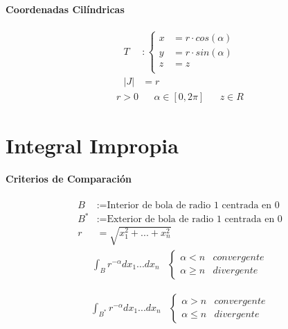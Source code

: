 \documentclass{article}
\begin{document}
\begin{multicols}{2}
      \paragraph{Coordenadas Cilíndricas}

        \begin{align*}
          T &:
          \begin{cases}
            x &= r \cdot cos(\alpha)\\
            y &= r \cdot sin(\alpha)\\
            z &= z \\
          \end{cases} \\
          \left|J\right| &= r
        \end{align*}
        \begin{align*}
          r > 0 &&  \alpha \in[0,2\pi] && z \in R
        \end{align*}

    \section{Integral Impropia}

      \paragraph{Criterios de Comparación}
        \begin{align*}
          B &:= \text{Interior de bola de radio 1 centrada en 0} \\
          B^* &:= \text{Exterior de bola de radio 1 centrada en 0} \\
          r &= \sqrt{x_1^2 + ... + x_n^2}
        \end{align*}
        \begin{align*}
          \int_B r^{-\alpha} dx_1...dx_n &
          \begin{cases}
            \alpha < n & convergente\\
            \alpha \geq n & divergente
          \end{cases}
        \end{align*}

        \begin{align*}
          \int_{B^*}r^{-\alpha} dx_1...dx_n &
          \begin{cases}
            \alpha > n & convergente\\
            \alpha \leq n & divergente
          \end{cases}
        \end{align*}

\end{multicols}
\end{document}
